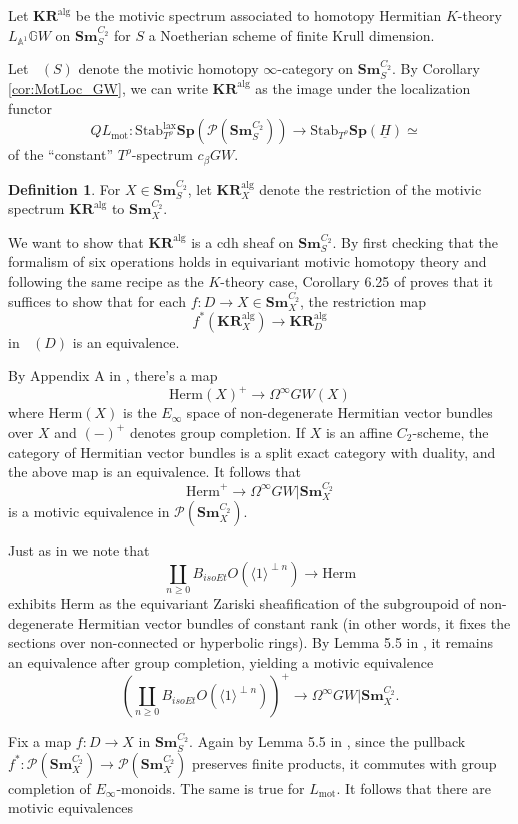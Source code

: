\documentclass[edeposit,fullpage]{uiucthesis2009}
\newcommand{\mbb}{\mathbb}
\newcommand{\mc}{\mathcal}
\newcommand{\Sm}[1]{\mathbf{Sm}_{#1}}
\newcommand{\Sp}{\mathbf{Sp}}
\newcommand{\KR}{\mathbf{KR}^{\mathrm{alg}}}
\DeclareMathOperator{\SH}{\underline{SH}}
\DeclareMathOperator{\HH}{\underline{H}}
\theoremstyle{plain}
\numberwithin{lemma}{section}
\theoremstyle{definition}
\newtheorem{definition}[lemma]{Definition}
\begin{document}
Let $\KR$ be the motivic spectrum associated to homotopy
Hermitian $K$-theory $L_{\mbb A^1}\mbb GW$ on $\Sm{S}^{C_2}$ for $S$ a
Noetherian scheme of finite Krull dimension. 

Let $\HH(S)$ denote the motivic homotopy $\infty$-category on
$\Sm{S}^{C_2}$. By Corollary \ref{cor:MotLoc_GW}, we can write $\KR$ as the image under the localization functor
\[
QL_{\mathrm{mot}} : \mathrm{Stab}^{\mathrm{lax}}_{T^\rho} \Sp(\mc
P(\Sm{S}^{C_2})) \rightarrow \mathrm{Stab}_{T^\rho} \Sp(\underline
H) \simeq \SH
\]
of the ``constant'' $T^\rho$-spectrum $c_{\beta}GW$.

\begin{definition}
For $X \in \Sm{S}^{C_2}$, let $\KR_X$ denote the restriction of the
motivic spectrum $\KR$ to $\Sm{X}^{C_2}$.
\end{definition}

We want to show that $\KR$ is a cdh sheaf on $\Sm{S}^{C_2}$. By first
checking that the formalism of six operations holds in equivariant
motivic homotopy theory and following the same recipe as the
$K$-theory case, Corollary 6.25 of \cite{HoyoisSixOp} proves that it suffices to show that for
each $f : D \rightarrow X \in \Sm{X}^{C_2}$, the restriction map
\[
f^*(\KR_X) \rightarrow \KR_D
\]
in $\SH(D)$ is an equivalence. 

By Appendix A in \cite{Schder}, there's a map 
\[
\mathrm{Herm}(X)^+ \rightarrow \Omega^\infty GW(X)
\]
where $\mathrm{Herm}(X)$ is the $E_\infty$ space of non-degenerate Hermitian vector
bundles over $X$ and $(-)^+$ denotes group completion. If $X$ is an
affine $C_2$-scheme, the category of Hermitian vector bundles is a
split exact category with duality, and the above map is an
equivalence. It follows that
\[
\mathrm{Herm}^+ \rightarrow \Omega^\infty GW|\Sm{X}^{C_2}
\]
is a motivic equivalence in $\mc P(\Sm{X}^{C_2})$. 

Just as in \cite{cdhdesc} we note that
\[
\coprod_{n \geq 0} B_{isoEt}O(\langle 1 \rangle^{\perp n}) \rightarrow \mathrm{Herm}
\]
exhibits $\mathrm{Herm}$ as the equivariant Zariski sheafification of
the subgroupoid of non-degenerate Hermitian vector bundles of constant
rank (in other words, it fixes the sections over non-connected or
hyperbolic rings). By Lemma 5.5 in \cite{cdhdesc}, it remains an
equivalence after group completion, yielding a motivic equivalence
\[
\left(\coprod_{n \geq 0} B_{isoEt}O(\langle 1 \rangle^{\perp
    n})\right)^+ \rightarrow \Omega^\infty GW|\Sm{X}^{C_2}.
\]

Fix a map $f : D \rightarrow X$ in $\Sm{S}^{C_2}$. Again by Lemma 5.5
in \cite{cdhdesc}, since the pullback $f^* : \mc P(\Sm{X}^{C_2})
\rightarrow \mc P(\Sm{X}^{C_2})$ preserves finite products, it
commutes with group completion of $E_\infty$-monoids. The same is true
for $L_{\mathrm{mot}}$. It follows that there are motivic equivalences
\end{document}
